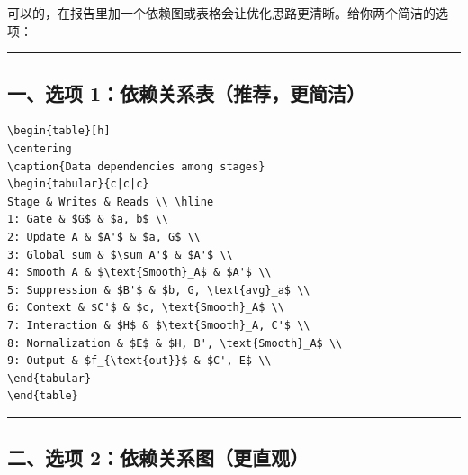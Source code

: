 \documentclass[11pt, a4paper]{article}
\begin{document}
\begin{aibox}
可以的，在报告里加一个依赖图或表格会让优化思路更清晰。给你两个简洁的选项：

\begin{center}\rule{\textwidth}{0.4pt}\end{center}

\subsection*{一、选项 1：依赖关系表（推荐，更简洁）}

\begin{tcolorbox}[colback=white,colframe=gray!50!white,boxrule=0.5pt,arc=2pt,left=5pt,right=5pt,top=5pt,bottom=5pt]
\begin{verbatim}
\begin{table}[h]
\centering
\caption{Data dependencies among stages}
\begin{tabular}{c|c|c}
Stage & Writes & Reads \\ \hline
1: Gate & $G$ & $a, b$ \\
2: Update A & $A'$ & $a, G$ \\
3: Global sum & $\sum A'$ & $A'$ \\
4: Smooth A & $\text{Smooth}_A$ & $A'$ \\
5: Suppression & $B'$ & $b, G, \text{avg}_a$ \\
6: Context & $C'$ & $c, \text{Smooth}_A$ \\
7: Interaction & $H$ & $\text{Smooth}_A, C'$ \\
8: Normalization & $E$ & $H, B', \text{Smooth}_A$ \\
9: Output & $f_{\text{out}}$ & $C', E$ \\
\end{tabular}
\end{table}
\end{verbatim}
\end{tcolorbox}

\begin{center}\rule{\textwidth}{0.4pt}\end{center}

\subsection*{二、选项 2：依赖关系图（更直观）}


\end{aibox}
\end{document}
